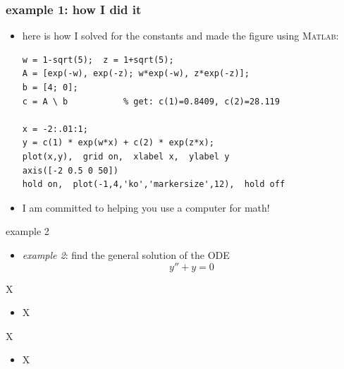 \documentclass{beamer}
\newcommand{\Matlab}{\textsc{Matlab}}
\begin{document}
\begin{frame}[fragile]
\frametitle{example 1: how I did it}

\begin{itemize}
\item here is how I solved for the constants and made the figure using \Matlab:

\bigskip
\begin{Verbatim}[fontsize=\small]
w = 1-sqrt(5);  z = 1+sqrt(5);
A = [exp(-w), exp(-z); w*exp(-w), z*exp(-z)];
b = [4; 0];
c = A \ b           % get: c(1)=0.8409, c(2)=28.119

x = -2:.01:1;
y = c(1) * exp(w*x) + c(2) * exp(z*x); 
plot(x,y),  grid on,  xlabel x,  ylabel y
axis([-2 0.5 0 50])
hold on,  plot(-1,4,'ko','markersize',12),  hold off
\end{Verbatim}

\bigskip
\item I am committed to helping you use a computer for math!

\end{itemize}
\end{frame}



\begin{frame}{example 2}

\begin{itemize}
\item \emph{example 2}: find the general solution of the ODE
    $$y'' + y = 0$$
\end{itemize}

\vspace{55mm}
\end{frame}


\begin{frame}{X}

\begin{itemize}
\item X
\end{itemize}
\end{frame}


\begin{frame}{X}

\begin{itemize}
\item X
\end{itemize}
\end{frame}
\end{document}
